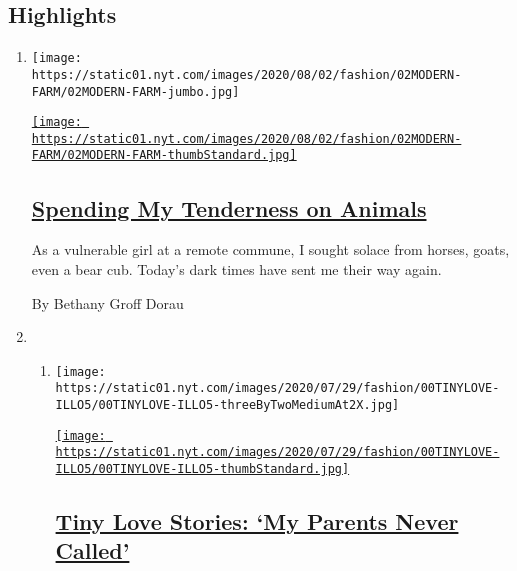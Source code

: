 \hypertarget{highlights}{%
\subsection{Highlights}\label{highlights}}

\begin{enumerate}
\def\labelenumi{\arabic{enumi}.}
\item
  \texttt{[image: https://static01.nyt.com/images/2020/08/02/fashion/02MODERN-FARM/02MODERN-FARM-jumbo.jpg]}

  \href{/2020/07/31/style/modern-love-spending-tenderness-on-animals.html}{\texttt{[image: https://static01.nyt.com/images/2020/08/02/fashion/02MODERN-FARM/02MODERN-FARM-thumbStandard.jpg]}}

  \hypertarget{spending-my-tenderness-on-animals}{%
  \subsection{\texorpdfstring{\href{/2020/07/31/style/modern-love-spending-tenderness-on-animals.html}{Spending
  My Tenderness on
  Animals}}{Spending My Tenderness on Animals}}\label{spending-my-tenderness-on-animals}}

  As a vulnerable girl at a remote commune, I sought solace from horses,
  goats, even a bear cub. Today's dark times have sent me their way
  again.

  By Bethany Groff Dorau
\item
  \begin{enumerate}
  \def\labelenumii{\arabic{enumii}.}
  \item
    \texttt{[image: https://static01.nyt.com/images/2020/07/29/fashion/00TINYLOVE-ILLO5/00TINYLOVE-ILLO5-threeByTwoMediumAt2X.jpg]}

    \href{/2020/07/28/style/tiny-modern-love-stories-coronavirus-my-parents-never-called.html}{\texttt{[image: https://static01.nyt.com/images/2020/07/29/fashion/00TINYLOVE-ILLO5/00TINYLOVE-ILLO5-thumbStandard.jpg]}}

    \hypertarget{tiny-love-stories-my-parents-never-called}{%
    \subsection{\texorpdfstring{\href{/2020/07/28/style/tiny-modern-love-stories-coronavirus-my-parents-never-called.html}{Tiny
    Love Stories: `My Parents Never
    Called'}}{Tiny Love Stories: `My Parents Never Called'}}\label{tiny-love-stories-my-parents-never-called}}


\end{enumerate}
\end{enumerate}
